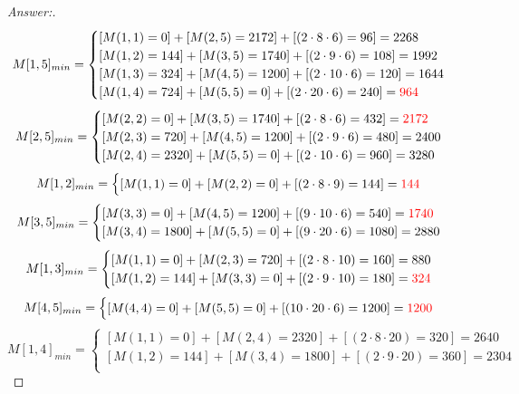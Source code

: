 \documentclass[11pt]{article}
\theoremstyle{definition}
\theoremstyle{definition}
\theoremstyle{definition}
\begin{document}
\begin{proof}[Answer:] \
\[
M[1, 5]_{min} = \begin{cases} 
[M(1,1) = 0] + [M(2, 5) = 2172] + [(2 \cdot 8 \cdot 6) = 96] = 2268  \\
[M(1,2) = 144] + [M(3, 5) = 1740] + [(2 \cdot 9 \cdot 6) = 108] = 1992  \\
[M(1,3) = 324] + [M(4, 5) = 1200] + [(2 \cdot 10 \cdot 6) = 120] = 1644  \\
[M(1,4) = 724] + [M(5, 5) = 0] + [(2 \cdot 20 \cdot 6) = 240] = \color{red} 964  \\
\end{cases}
\]
\[
M[2, 5]_{min} = \begin{cases} 
[M(2, 2) = 0] + [M(3, 5) = 1740] + [(2 \cdot 8 \cdot 6) = 432] = \color{red} 2172  \\
[M(2, 3) = 720] + [M(4, 5) = 1200] + [(2 \cdot 9 \cdot 6) = 480] = 2400  \\
[M(2, 4) = 2320] + [M(5, 5) = 0] + [(2 \cdot 10 \cdot 6) = 960] = 3280  \\
\end{cases}
\]
\[
M[1, 2]_{min} = \begin{cases} 
[M(1, 1) = 0] + [M(2, 2) = 0] + [(2 \cdot 8 \cdot 9) = 144] = \color{red} 144  \\
\end{cases}
\]
\[
M[3, 5]_{min} = \begin{cases} 
[M(3, 3) = 0] + [M(4, 5) = 1200] + [(9 \cdot 10 \cdot 6) = 540] = \color{red} 1740  \\
[M(3, 4) = 1800] + [M(5, 5) = 0] + [(9 \cdot 20 \cdot 6) = 1080] = 2880  \\
\end{cases}
\]
\[
M[1, 3]_{min} = \begin{cases} 
[M(1, 1) = 0] + [M(2, 3) = 720] + [(2 \cdot 8 \cdot 10) = 160] = 880  \\
[M(1, 2) = 144] + [M(3, 3) = 0] + [(2 \cdot 9 \cdot 10) = 180] = \color{red} 324  \\
\end{cases}
\]
\[
M[4, 5]_{min} = \begin{cases} 
[M(4, 4) = 0] + [M(5, 5) = 0] + [(10 \cdot 20 \cdot 6) = 1200] = \color{red} 1200  \\
\end{cases}
\]
\[
M[1, 4]_{min} = \begin{cases} 
[M(1, 1) = 0] + [M(2, 4) = 2320] + [(2 \cdot 8 \cdot 20) = 320] = 2640  \\
[M(1, 2) = 144] + [M(3, 4) = 1800] + [(2 \cdot 9 \cdot 20) = 360] = 2304  \\

\end{cases}\]
\end{proof}
\end{document}
